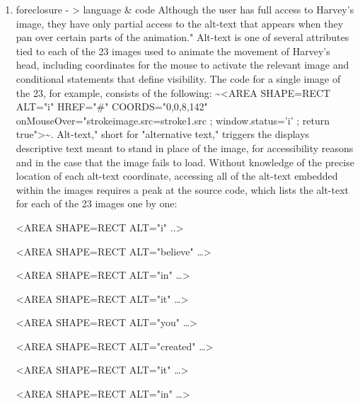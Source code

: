 \documentclass[11pt]{article}
\begin{document}
\begin{enumerate}

There are two interesting things here. The first is the way the
animation engages directly the sensuality of the human user. Not only
does the cursor implicate hand movement, in that the user \emph{moves}
Harvey's face by passing the mouse over it, but the animation itself
lends an aura of super-reality. Rather than represent a smooth
movement from side to side, Harvey's head takes little jumps from one
position to another. A look into the source code reveals that the
animation consists of 23 images that loop according to the position of
the user's mouse. The effect is a slight lag, a series of fleeting
pauses that intensify Harvey's direct gaze into the camera.

\item foreclosure - > language \& code
\label{sec:org5e6a6c1}
Although the user has full access to Harvey's image, they have only
partial access to the alt-text that appears when they pan over certain
parts of the animation." Alt-text is one of several attributes tied to
each of the 23 images used to animate the movement of Harvey's head,
including coordinates for the mouse to activate the relevant image and
conditional statements that define visibility. The code for a single
image of the 23, for example, consists of the following: \textasciitilde{}<AREA
SHAPE=RECT ALT="i" HREF="\#" COORDS="0,0,8,142"
onMouseOver="strokeimage.src=stroke1.src ; window.status='i' ; return
true">\textasciitilde{}. Alt-text," short for "alternative text," triggers the
displays descriptive text meant to stand in place of the image, for
accessibility reasons and in the case that the image fails to
load. Without knowledge of the precise location of each alt-text
coordinate, accessing all of the alt-text embedded within the images
requires a peak at the source code, which lists the alt-text for each
of the 23 images one by one:
\begin{SOURCE}
<AREA SHAPE=RECT ALT="i" ..>

<AREA SHAPE=RECT ALT="believe" \ldots{}>

<AREA SHAPE=RECT ALT="in" \ldots{}>

<AREA SHAPE=RECT ALT="it" \ldots{}>

<AREA SHAPE=RECT ALT="you" \ldots{}>

<AREA SHAPE=RECT ALT="created" \ldots{}>

<AREA SHAPE=RECT ALT="it" \ldots{}>

<AREA SHAPE=RECT ALT="in" \ldots{}>


\end{SOURCE}
\end{enumerate}
\end{document}
